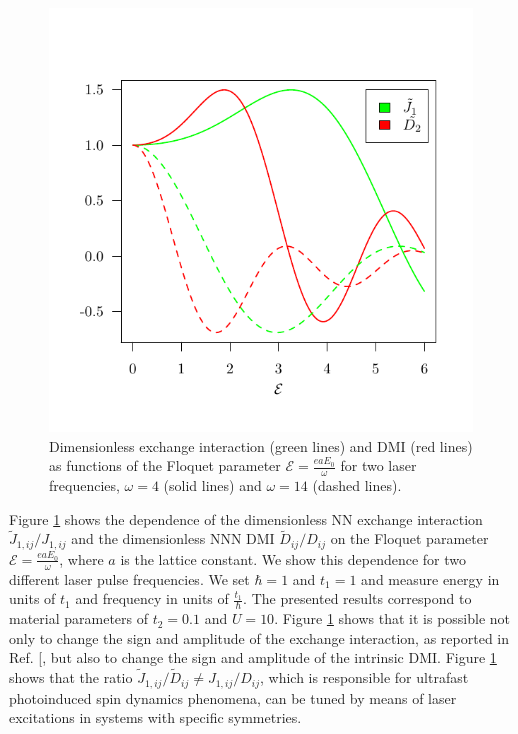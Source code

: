 \documentclass[aps,prl,twocolumn,amsmath,amssymb,nobibnotes]{revtex4-1}%
\renewcommand{\cite}[1]{{[}\onlinecite{#1}{]}}
\begin{document}
\begin{figure}[t]
\centering
\vspace{-1.3cm}
\includegraphics[width=\columnwidth]{NNvsNNN1_big_margin.pdf}
\vspace{-1cm}
\caption{Dimensionless exchange interaction (green lines) and DMI (red lines) as functions of the Floquet parameter $\mathcal{E} = \frac{eaE_0}{\omega}$ for two laser frequencies, $\omega = 4$ (solid lines) and $\omega = 14$ (dashed lines).}
\label{fig2}
\end{figure}

Figure \ref{fig2} shows the dependence of the dimensionless NN exchange interaction $\tilde{J}_{1,ij}/J_{1,ij}$ and the dimensionless NNN DMI $\tilde{D}_{ij}/D_{ij}$ on the Floquet parameter $\mathcal{E} = \frac{e a E_0}{\omega}$, where $a$ is the lattice constant. We show this dependence for two different laser pulse frequencies. We set $\hbar = 1$ and $t_1=1$ and measure energy in units of $t_1$ and frequency in units of $\frac{t_1}{\hbar}$. The presented results correspond to material parameters of $t_2=0.1$ and $U = 10$. Figure \ref{fig2} shows that it is possible not only to change the sign and amplitude of the exchange interaction, as reported in Ref. \cite{Mentink2015}, but also to change the sign and amplitude of the intrinsic DMI. Figure \ref{fig2} shows that the ratio $\tilde{J}_{1,ij}/\tilde{D}_{ij}\neq J_{1,ij}/D_{ij}$, which is responsible for ultrafast photoinduced spin dynamics phenomena, can be tuned by means of laser excitations in systems with specific symmetries.
\end{document}
